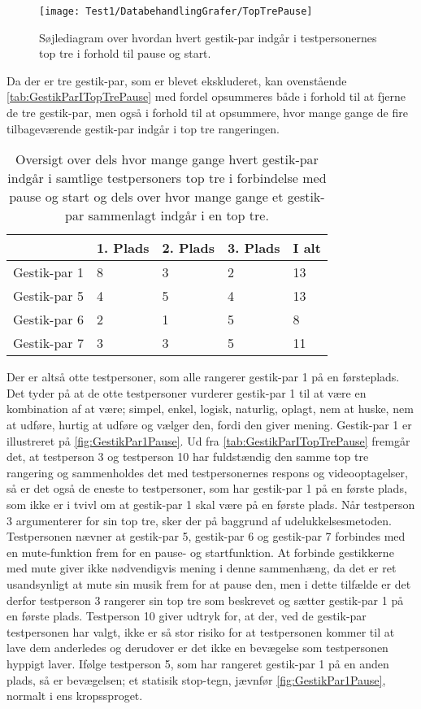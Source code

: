 %
\begin{figure}[H]
	\centering
	\texttt{[image: Test1/DatabehandlingGrafer/TopTrePause]}
	\caption{Søjlediagram over hvordan hvert gestik-par indgår i testpersonernes top tre i forhold til pause og start.}
	\label{fig:SamletTopTrePause}
\end{figure}
\noindent
%
Da der er tre gestik-par, som er blevet ekskluderet, kan ovenstående  \autoref{tab:GestikParITopTrePause} med fordel opsummeres både i forhold til at fjerne de tre gestik-par, men også i forhold til at opsummere, hvor mange gange de fire tilbageværende gestik-par indgår i top tre rangeringen. 
%
\begin{table}[H]
	\centering
	\begin{tabular}{ | p{2.4cm} | p{2.4cm} | p{2.4cm} | p{2.4cm} |p{2.4cm}|}
	\hline
		 & 1. Plads & 2. Plads & 3. Plads & I alt \\ \hline
		Gestik-par 1 & 8 & 3 & 2 & 13\\ \hline
		Gestik-par 5 & 4 & 5 & 4 & 13\\ \hline
		Gestik-par 6 & 2 & 1 & 5 & 8\\ \hline 
		Gestik-par 7 & 3 & 3 & 5 & 11\\ \hline
	\end{tabular}
	\caption{Oversigt over dels hvor mange gange hvert gestik-par indgår i samtlige testpersoners top tre i forbindelse med pause og start og dels over hvor mange gange et gestik-par sammenlagt indgår i en top tre.}
	\label{tab:GestikParITopTrePauseOversigt}
\end{table}
\noindent
%
Der er altså otte testpersoner, som alle rangerer gestik-par 1 på en førsteplads. Det tyder på at de otte testpersoner vurderer gestik-par 1 til at være en kombination af at være; simpel, enkel, logisk, naturlig, oplagt, nem at huske, nem at udføre, hurtig at udføre og vælger den, fordi den giver mening. Gestik-par 1 er illustreret på \autoref{fig:GestikPar1Pause}. Ud fra \autoref{tab:GestikParITopTrePause} fremgår det, at testperson 3 og testperson 10 har fuldstændig den samme top tre rangering og sammenholdes det med testpersonernes respons og videooptagelser, så er det også de eneste to testpersoner, som har gestik-par 1 på en første plads, som ikke er i tvivl om at gestik-par 1 skal være på en første plads. Når testperson 3 argumenterer for sin top tre, sker der på baggrund af udelukkelsesmetoden. Testpersonen nævner at gestik-par 5, gestik-par 6 og gestik-par 7 forbindes med en mute-funktion frem for en pause- og startfunktion. At forbinde gestikkerne med mute giver ikke nødvendigvis mening i denne sammenhæng, da det er ret usandsynligt at mute sin musik frem for at pause den, men i dette tilfælde er det derfor testperson 3 rangerer sin top tre som beskrevet og sætter gestik-par 1 på en første plads. Testperson 10 giver udtryk for, at der, ved de gestik-par testpersonen har valgt, ikke er så stor risiko for at testpersonen kommer til at lave dem anderledes og derudover er det ikke en bevægelse som testpersonen hyppigt laver. Ifølge testperson 5, som har rangeret gestik-par 1 på en anden plads, så er bevægelsen; et statisik stop-tegn, jævnfør \autoref{fig:GestikPar1Pause}, normalt i ens kropssproget.   
